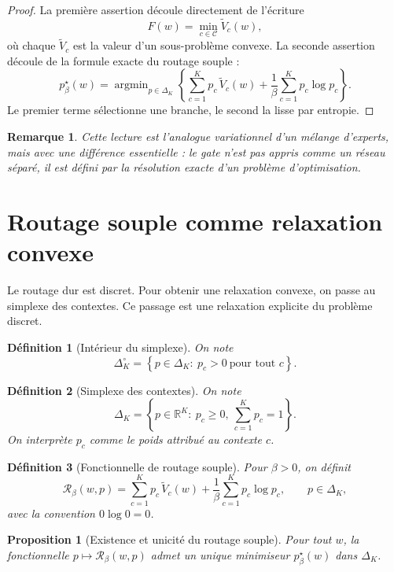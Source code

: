 \documentclass[11pt,a4paper]{article}
\newtheorem{definition}{Définition}[section]
\newtheorem{proposition}{Proposition}[section]
\newtheorem{remark}{Remarque}[section]
\DeclareMathOperator{\argmin}{argmin}
\newcommand{\R}{\mathbb R}
\newcommand{\Ccal}{\mathcal C}
\newcommand{\Rcal}{\mathcal R}
\begin{document}
\begin{proof}
La première assertion découle directement de l'écriture
\[
F(w)=\min_{c\in\Ccal}\widetilde V_c(w),
\]
où chaque \(\widetilde V_c\) est la valeur d'un sous-problème convexe. La seconde assertion découle de la formule exacte du routage souple :
\[
p^\star_\beta(w)
=
\argmin_{p\in\Delta_K}
\left\{
\sum_{c=1}^K p_c\,\widetilde V_c(w)
+
\frac{1}{\beta}\sum_{c=1}^K p_c\log p_c
\right\}.
\]
Le premier terme sélectionne une branche, le second la lisse par entropie.
\end{proof}

\begin{remark}
Cette lecture est l'analogue variationnel d'un mélange d'experts, mais avec une différence essentielle : le gate n'est pas appris comme un réseau séparé, il est défini par la résolution exacte d'un problème d'optimisation.
\end{remark}



\section{Routage souple comme relaxation convexe}

Le routage dur est discret. Pour obtenir une relaxation convexe, on passe au simplexe des contextes. Ce passage est une relaxation explicite du problème discret.

\begin{definition}[Intérieur du simplexe]
On note
\[
\Delta_K^\circ
=
\left\{
p\in\Delta_K:\ p_c>0\ \text{pour tout }c
\right\}.
\]
\end{definition}

\begin{definition}[Simplexe des contextes]
On note
\[
\Delta_K
=
\left\{
p\in\R^K:\ p_c\ge 0,\ \sum_{c=1}^K p_c=1
\right\}.
\]
On interprète \(p_c\) comme le poids attribué au contexte \(c\).
\end{definition}

\begin{definition}[Fonctionnelle de routage souple]
Pour \(\beta>0\), on définit
\[
\Rcal_\beta(w,p)
=
\sum_{c=1}^K p_c\,\widetilde V_c(w)
+
\frac{1}{\beta}\sum_{c=1}^K p_c\log p_c,
\qquad p\in\Delta_K,
\]
avec la convention \(0\log 0=0\).
\end{definition}

\begin{proposition}[Existence et unicité du routage souple]
Pour tout \(w\), la fonctionnelle \(p\mapsto \Rcal_\beta(w,p)\) admet un unique minimiseur \(p^\star_\beta(w)\) dans \(\Delta_K\).
\end{proposition}
\end{document}
